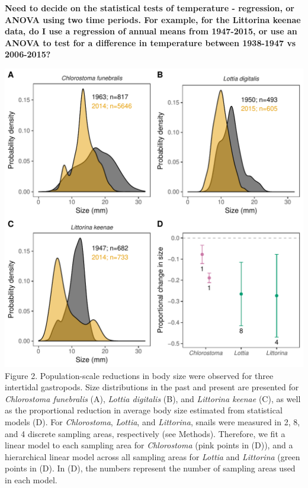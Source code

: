 \documentclass[11pt,]{article}
\begin{document}
\textbf{Need to decide on the statistical tests of temperature -
regression, or ANOVA using two time periods. For example, for the
Littorina keenae data, do I use a regression of annual means from
1947-2015, or use an ANOVA to test for a difference in temperature
between 1938-1947 vs 2006-2015?}

\newpage

\includegraphics{../../figs_ms/plot_size_frequncy_density_4panel.pdf}
Figure 2. Population-scale reductions in body size were observed for
three intertidal gastropods. Size distributions in the past and present
are presented for \emph{Chlorostoma funebralis} (A), \emph{Lottia
digitalis} (B), and \emph{Littorina keenae} (C), as well as the
proportional reduction in average body size estimated from statistical
models (D). For \emph{Chlorostoma}, \emph{Lottia}, and \emph{Littorina},
snails were measured in 2, 8, and 4 discrete sampling areas,
respectively (see Methods). Therefore, we fit a linear model to each
sampling area for \emph{Chlorostoma} (pink points in (D)), and a
hierarchical linear model across all sampling areas for \emph{Lottia}
and \emph{Littorina} (green points in (D). In (D), the numbers represent
the number of sampling areas used in each model.

\newpage  
\end{document}

